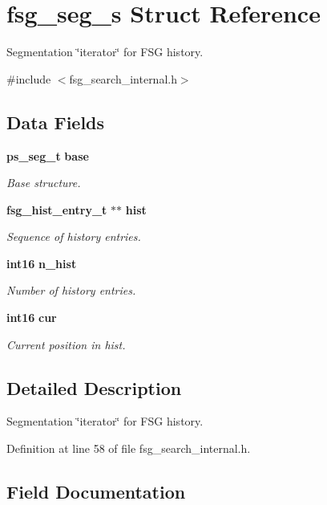 \section{fsg\-\_\-seg\-\_\-s \-Struct \-Reference}
\label{structfsg__seg__s}


\-Segmentation \char`\"{}iterator\char`\"{} for \-F\-S\-G history.  




{\ttfamily \#include $<$fsg\-\_\-search\-\_\-internal.\-h$>$}

\subsection*{\-Data \-Fields}
\begin{DoxyCompactItemize}
\item 
{\bf ps\-\_\-seg\-\_\-t} {\bf base}
\begin{DoxyCompactList}\small\item\em \-Base structure. \end{DoxyCompactList}\item 
{\bf fsg\-\_\-hist\-\_\-entry\-\_\-t} $\ast$$\ast$ {\bf hist}
\begin{DoxyCompactList}\small\item\em \-Sequence of history entries. \end{DoxyCompactList}\item 
{\bf int16} {\bf n\-\_\-hist}
\begin{DoxyCompactList}\small\item\em \-Number of history entries. \end{DoxyCompactList}\item 
{\bf int16} {\bf cur}
\begin{DoxyCompactList}\small\item\em \-Current position in hist. \end{DoxyCompactList}\end{DoxyCompactItemize}


\subsection{\-Detailed \-Description}
\-Segmentation \char`\"{}iterator\char`\"{} for \-F\-S\-G history. 

\-Definition at line 58 of file fsg\-\_\-search\-\_\-internal.\-h.



\subsection{\-Field \-Documentation}
